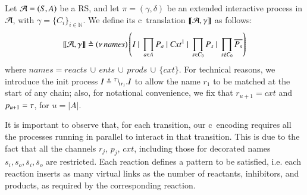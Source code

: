 \begin{definition}[Translation]
\label{def:trans}
Let ${\cal A} = (S, A)$ be a RS, and let $\pi=(\gamma,\delta)$ be an extended interactive process in ${\cal A}$, with  $\gamma=\{C_i\}_{i\in\mathbb{N}}$. 
We define its c\CNA~translation $\llbracket{\cal A},\gamma \rrbracket$ as follows: 
$$
\llbracket{\cal A},\gamma \rrbracket 
\triangleq
 (\nu\, \mathit{names})\left(I ~|~ \prod_{a\in A} P_a ~|~  \mathit{Cxt}^1 ~|~\prod_{s\in C_0}P_{s} ~|~ \prod_{s \notin C_0}\overline{P_s}\right)
$$
where $\mathit{names} = \mathit{reacts}\, \cup\, \mathit{ents}\, \cup \, \mathit{prods}\, \cup\, \{cxt\}$. 
For technical reasons, we introduce the init process $I \triangleq {}^{\tau} \backslash_{r_1}.I$
to allow the name $r_1$ to be matched at the start of any chain; also, 
for notational convenience, we fix that 
$r_{u+1} = \mathit{cxt}$ and $p_{u+1}=\tau$,  for $u=|A|$.
\end{definition}
 



It is important to observe that,   for each transition, our c\CNA \ encoding requires  all the processes 
running in parallel to  interact in that transition.
This is due to the fact that  all the channels $r_j$, $p_j$, $\mathit{cxt}$, including those for decorated names $s_{i},s_{o},\overline{s}_i,\overline{s}_o$ are  restricted.
Each reaction defines a pattern to be satisfied, i.e. each reaction inserts as many virtual links  as  the number of reactants, inhibitors, and products, as required by the corresponding reaction.

